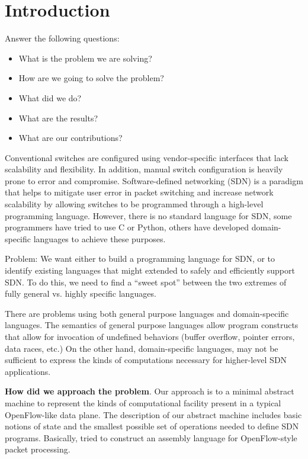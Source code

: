 
\section{Introduction}

Answer the following questions:
\begin{itemize}
\item What is the problem we are solving?
\item How are we going to solve the problem?
\item What did we do?
\item What are the results?
\item What are our contributions?
\end{itemize}

Conventional switches are configured using vendor-specific interfaces that lack scalability and flexibility. In addition, manual switch configuration is heavily prone to error and compromise. Software-defined networking (SDN) is a paradigm that helps to mitigate user error in packet switching and increase network scalability by allowing switches to be programmed through a high-level programming language. However, there is no standard language for SDN, some programmers have tried to use C or Python, others have developed domain-specific languages to achieve these purposes.

Problem: We want either to build a programming language for SDN, or to identify existing languages that might extended to safely and efficiently support SDN.
To do this, we need to find a ``sweet spot'' between the two extremes of fully general vs. highly specific languages.

There are problems using both general purpose languages and domain-specific
languages. 
The semantics of general purpose languages allow program constructs that
allow for invocation of undefined behaviors (buffer overflow, pointer errors, 
data races, etc.) 
On the other hand, domain-specific languages, may not be sufficient to express the kinds of computations necessary for higher-level SDN applications.

\textbf{How did we approach the problem}.
Our approach is to a minimal abstract machine to represent the kinds of computational facility present in a typical OpenFlow-like data plane.
The description of our abstract machine includes basic notions of state and the smallest possible set of operations needed to define SDN programs.
Basically, tried to construct an assembly language for OpenFlow-style packet processing.

